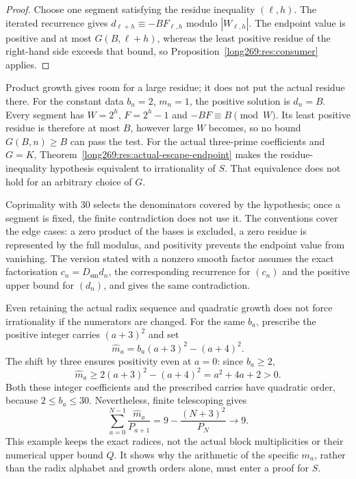 \begin{proof}
Choose one segment satisfying the residue inequality $(\ell,h)$.  The iterated recurrence gives
$d_{\ell+h}\equiv-BF_{\ell,h}$ modulo $|W_{\ell,h}|$.  The endpoint value is
positive and at most $G(B,\ell+h)$, whereas the least positive residue of
the right-hand side exceeds that bound, so Proposition~\ref{long269:res:consumer}
applies.
\end{proof}

Product growth gives room for a large residue; it does not put the
actual residue there. For the constant data $b_n=2$, $m_n=1$, the positive
solution is $d_n=B$. Every segment has $W=2^h$, $F=2^h-1$ and
$-BF\equiv B\pmod W$. Its least positive residue is therefore at most
$B$, however large $W$ becomes, so no bound $G(B,n)\ge B$ can pass the
test.  For the actual three-prime coefficients and $G=K$,
Theorem~\ref{long269:res:actual-escape-endpoint} makes the residue-inequality hypothesis
equivalent to irrationality of $S$.  That equivalence does not hold for
an arbitrary choice of $G$.

Coprimality with $30$ selects the denominators covered by the hypothesis;
once a segment is fixed, the finite contradiction does not use it.  The conventions cover the edge cases: a zero product of the bases is excluded, a zero residue is
represented by the full modulus, and positivity prevents the endpoint value from vanishing.  The version stated with a nonzero smooth factor assumes the exact
factorisation $c_n=D_{\mathrm{sm}}d_n$, the corresponding recurrence for
$(c_n)$ and the positive upper bound for $(d_n)$, and gives the same
contradiction.

Even retaining the actual radix sequence and quadratic growth does not
force irrationality if the numerators are changed.  For the same $b_a$,
prescribe the positive integer carries $(a+3)^2$ and set
\[
 \widehat m_a=b_a(a+3)^2-(a+4)^2.
\]
The shift by three ensures positivity even at $a=0$: since $b_a\ge2$,
\[
 \widehat m_a\ge2(a+3)^2-(a+4)^2=a^2+4a+2>0.
\]
Both these integer coefficients and the prescribed carries have quadratic
order, because $2\le b_a\le30$.  Nevertheless, finite telescoping gives
\[
 \sum_{a=0}^{N-1}\frac{\widehat m_a}{P_{a+1}}
 =9-\frac{(N+3)^2}{P_N}\longrightarrow9.
\]
This example keeps the exact radices, not the actual block multiplicities
or their numerical upper bound $Q$.  It shows why the arithmetic of the
specific $m_a$, rather than the radix alphabet and growth orders alone,
must enter a proof for $S$.

